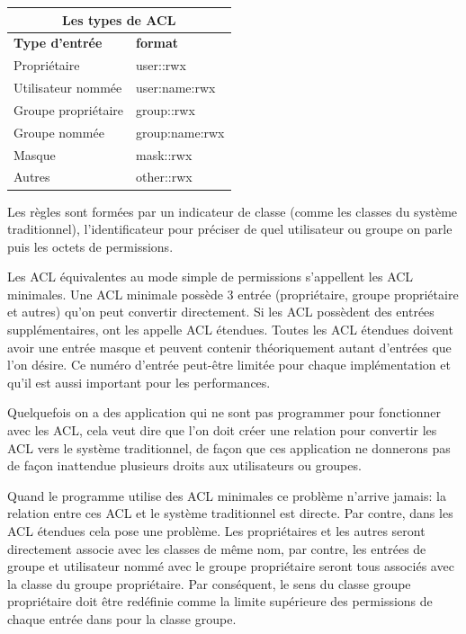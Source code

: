 \documentclass{article}
\begin{document}
\begin{center}
\begin{tabular}{|l|l|}
  \hline
    \multicolumn{2}{|c|}{Les types de ACL} \\
  \hline
\textbf{Type d'entrée} & \textbf{format} \\
  \hline
Propriétaire & user::rwx \\
Utilisateur nommée & user:name:rwx \\
Groupe propriétaire & group::rwx \\
Groupe nommée & group:name:rwx \\
Masque & mask::rwx \\
Autres & other::rwx \\
  \hline
\end{tabular}
\label{tab:entree}
\end{center}
 
Les règles sont formées par un indicateur de classe (comme les classes du système traditionnel), l'identificateur pour préciser de quel utilisateur ou groupe on parle puis les octets de permissions.

Les ACL équivalentes au mode simple de permissions s'appellent les ACL minimales. Une ACL minimale possède 3 entrée (propriétaire, groupe propriétaire et autres) qu'on peut convertir directement. Si les ACL possèdent des entrées supplémentaires, ont les appelle ACL étendues. Toutes les ACL étendues doivent avoir une entrée masque et peuvent contenir théoriquement autant d'entrées que l'on désire. Ce numéro d'entrée peut-être limitée pour chaque implémentation et qu'il est aussi important pour les performances.

Quelquefois on a des application qui ne sont pas programmer pour fonctionner avec les ACL, cela veut dire que l'on doit créer une relation pour convertir les ACL vers le système traditionnel, de façon que ces application ne donnerons pas de façon inattendue plusieurs droits aux utilisateurs ou groupes. 

Quand le programme utilise des ACL minimales ce problème n'arrive jamais: la relation entre ces ACL et le système traditionnel est directe. Par contre, dans les ACL étendues cela pose une problème. Les propriétaires et les autres seront directement associe avec les classes de même nom, par contre, les entrées de groupe et utilisateur nommé avec le groupe propriétaire seront tous associés avec la classe du groupe propriétaire. Par conséquent, le sens du classe groupe propriétaire doit être redéfinie comme la limite supérieure des permissions de chaque entrée dans pour la classe groupe.
\end{document}
